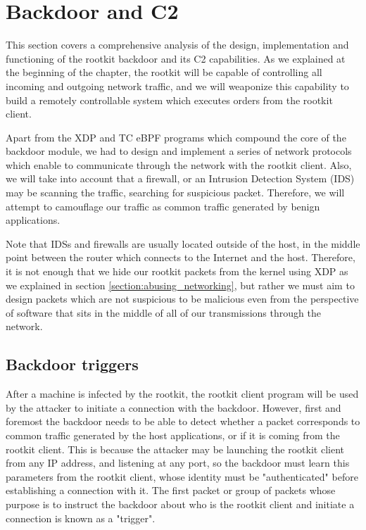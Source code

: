 \section{Backdoor and C2}
This section covers a comprehensive analysis of the design, implementation and functioning of the rootkit backdoor and its C2 capabilities. As we explained at the beginning of the chapter, the rootkit will be capable of controlling all incoming and outgoing network traffic, and we will weaponize this capability to build a remotely controllable system which executes orders from the rootkit client.

Apart from the XDP and TC eBPF programs which compound the core of the backdoor module, we had to design and implement a series of network protocols which enable to communicate through the network with the rootkit client. Also, we will take into account that a firewall, or an Intrusion Detection System (IDS) \cite{ips} may be scanning the traffic, searching for suspicious packet. Therefore, we will attempt to camouflage our traffic as common traffic generated by benign applications. 

Note that IDSs and firewalls are usually located outside of the host, in the middle point between the router which connects to the Internet and the host. Therefore, it is not enough that we hide our rootkit packets from the kernel using XDP as we explained in section \ref{section:abusing_networking}, but rather we must aim to design packets which are not suspicious to be malicious even from the perspective of software that sits in the middle of all of our transmissions through the network.

\subsection{Backdoor triggers}
After a machine is infected by the rootkit, the rootkit client program will be used by the attacker to initiate a connection with the backdoor. However, first and foremost the backdoor needs to be able to detect whether a packet corresponds to common traffic generated by the host applications, or if it is coming from the rootkit client. This is because the attacker may be launching the rootkit client from any IP address, and listening at any port, so the backdoor must learn this parameters from the rootkit client, whose identity must be "authenticated" before establishing a connection with it. The first packet or group of packets whose purpose is to instruct the backdoor about who is the rootkit client and initiate a connection is known as a "trigger".

